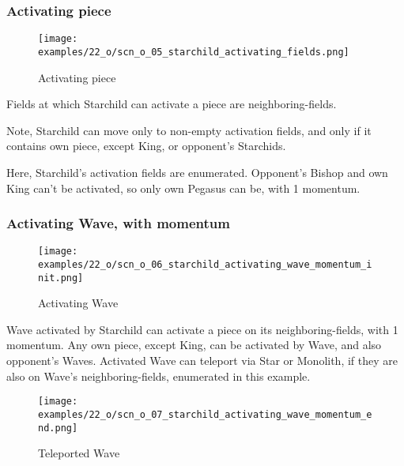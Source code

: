 \vspace*{1.1\baselineskip}
\subsubsection*{Activating piece}

\vspace*{-0.9\baselineskip}
\noindent
\begin{wrapfigure}[7]{l}{0.4\textwidth}
\centering
\texttt{[image: examples/22\_o/scn\_o\_05\_starchild\_activating\_fields.png]}
\caption{Activating piece}
\label{fig:scn_o_05_starchild_activating_fields}
\end{wrapfigure}
Fields at which Starchild can activate a piece are neighboring-fields.

Note, Starchild can move only to non-empty activation fields, and only if it contains
own piece, except King, or opponent's Starchids.

Here, Starchild’s activation fields are enumerated. Opponent's Bishop and own King can't
be activated, so only own Pegasus can be, with 1 momentum.

\vspace*{-1.1\baselineskip}
\subsubsection*{Activating Wave, with momentum}

\vspace*{-0.9\baselineskip}
\noindent
\begin{wrapfigure}[10]{l}{0.4\textwidth}
\centering
\texttt{[image: examples/22\_o/scn\_o\_06\_starchild\_activating\_wave\_momentum\_init.png]}
\caption{Activating Wave}
\label{fig:scn_o_06_starchild_activating_wave_momentum_init}
\end{wrapfigure}
Wave activated by Starchild can activate a piece on its neighboring-fields, with 1 momentum.
Any own piece, except King, can be activated by Wave, and also opponent's Waves.
Activated Wave can teleport via Star or Monolith, if they are also on Wave's neighboring-fields,
enumerated in this example.

\clearpage %

\vspace*{-2.1\baselineskip}
\noindent
\begin{figure}[!h]
\texttt{[image: examples/22\_o/scn\_o\_07\_starchild\_activating\_wave\_momentum\_end.png]}
\caption{Teleported Wave}
\label{fig:scn_o_07_starchild_activating_wave_momentum_end}
\end{figure}

